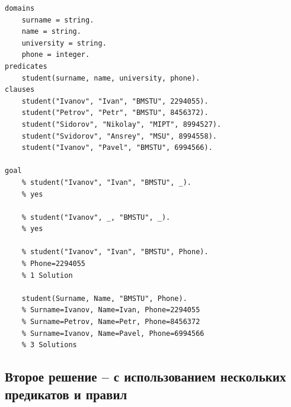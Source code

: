 \documentclass[12pt]{report}
\begin{document}
\begin{lstlisting}
domains
	surname = string.
	name = string.
	university = string.
	phone = integer.
predicates
	student(surname, name, university, phone).
clauses
	student("Ivanov", "Ivan", "BMSTU", 2294055).
	student("Petrov", "Petr", "BMSTU", 8456372).
	student("Sidorov", "Nikolay", "MIPT", 8994527).
	student("Svidorov", "Ansrey", "MSU", 8994558).
	student("Ivanov", "Pavel", "BMSTU", 6994566).

goal
	% student("Ivanov", "Ivan", "BMSTU", _).
	% yes
	
	% student("Ivanov", _, "BMSTU", _).
	% yes
	
	% student("Ivanov", "Ivan", "BMSTU", Phone).
	% Phone=2294055
	% 1 Solution
	
	student(Surname, Name, "BMSTU", Phone). 
	% Surname=Ivanov, Name=Ivan, Phone=2294055
	% Surname=Petrov, Name=Petr, Phone=8456372
	% Surname=Ivanov, Name=Pavel, Phone=6994566
	% 3 Solutions 
\end{lstlisting}


\subsection*{Второе решение -- с использованием нескольких предикатов и правил}
\end{document}
